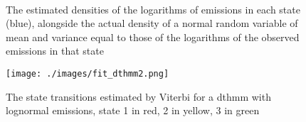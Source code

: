 \begin{figure}
\centering
{}
 \\

\caption{The estimated densities of the logarithms of emissions in each state (blue), alongside the actual density of a normal random variable of mean and variance equal to those of the logarithms of the observed emissions in that state}
\label{densities_mmpp3}
\end{figure}

\begin{figure}
\centering
\texttt{[image: ./images/fit\_dthmm2.png]}
\caption{The state transitions estimated by Viterbi for a dthmm with lognormal emissions, state 1 in red, 2 in yellow, 3 in green}
\label{fit_dthmm2}
\end{figure}

